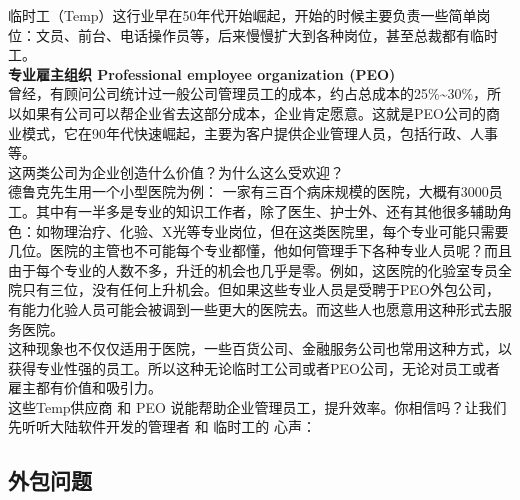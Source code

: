 临时工（Temp）这行业早在50年代开始崛起，开始的时候主要负责一些简单岗位：文员、前台、电话操作员等，后来慢慢扩大到各种岗位，甚至总裁都有临时工。\\
\textbf{专业雇主组织 Professional employee organization (PEO)}\\
曾经，有顾问公司统计过一般公司管理员工的成本，约占总成本的25\%\textasciitilde{}30\%，所以如果有公司可以帮企业省去这部分成本，企业肯定愿意。这就是PEO公司的商业模式，它在90年代快速崛起，主要为客户提供企业管理人员，包括行政、人事等。\\
这两类公司为企业创造什么价值？为什么这么受欢迎？\\
德鲁克先生用一个小型医院为例：
一家有三百个病床规模的医院，大概有3000员工。其中有一半多是专业的知识工作者，除了医生、护士外、还有其他很多辅助角色：如物理治疗、化验、X光等专业岗位，但在这类医院里，每个专业可能只需要几位。医院的主管也不可能每个专业都懂，他如何管理手下各种专业人员呢？而且由于每个专业的人数不多，升迁的机会也几乎是零。例如，这医院的化验室专员全院只有三位，没有任何上升机会。但如果这些专业人员是受聘于PEO外包公司，有能力化验人员可能会被调到一些更大的医院去。而这些人也愿意用这种形式去服务医院。\\
这种现象也不仅仅适用于医院，一些百货公司、金融服务公司也常用这种方式，以获得专业性强的员工。所以这种无论临时工公司或者PEO公司，无论对员工或者雇主都有价值和吸引力。\\
这些Temp供应商 和 PEO
说能帮助企业管理员工，提升效率。你相信吗？让我们先听听大陆软件开发的管理者
和 临时工的 心声：

\hypertarget{ux5916ux5305ux95eeux9898}{%
\subsection{外包问题}\label{ux5916ux5305ux95eeux9898}}



